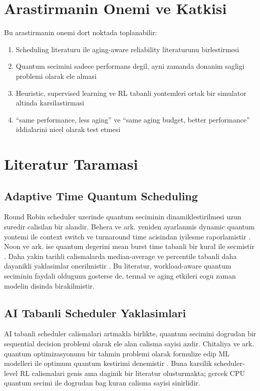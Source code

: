 \documentclass[12pt,a4paper]{article}
\begin{document}
\section{Arastirmanin Onemi ve Katkisi}

Bu arastirmanin onemi dort noktada toplanabilir:

\begin{enumerate}[leftmargin=*]
\item Scheduling literaturu ile aging-aware reliability literaturunu birlestirmesi
\item Quantum secimini sadece performans degil, ayni zamanda donanim sagligi problemi olarak ele almasi
\item Heuristic, supervised learning ve RL tabanli yontemleri ortak bir simulator altinda karsilastirmasi
\item ``same performance, less aging'' ve ``same aging budget, better performance'' iddialarini nicel olarak test etmesi
\end{enumerate}

\section{Literatur Taramasi}

\subsection{Adaptive Time Quantum Scheduling}

Round Robin scheduler uzerinde quantum seciminin dinamiklestirilmesi uzun suredir calisilan bir alandir.
Behera ve ark. yeniden ayarlanmis dynamic quantum yontemi ile context switch ve turnaround time acisindan iyilesme
raporlamistir \cite{behera2010}. Noon ve ark. ise quantum degerini mean burst time tabanli bir kural ile secmistir
\cite{noon2011}. Daha yakin tarihli calismalarda median-average ve percentile tabanli daha dayanikli yaklasimlar
onerilmistir \cite{marr2022,zohora2024}. Bu literatur, workload-aware quantum seciminin faydali oldugunu gosterse de,
termal ve aging etkileri cogu zaman modelin disinda birakilmistir.

\subsection{AI Tabanli Scheduler Yaklasimlari}

AI tabanli scheduler calismalari artmakla birlikte, quantum secimini dogrudan bir sequential decision problemi olarak
ele alan calisma sayisi azdir. Chitaliya ve ark. quantum optimizasyonunu bir tahmin problemi olarak formulize edip
ML modelleri ile optimum quantum kestirimi denemistir \cite{chitaliya2023}. Buna karsilik scheduler-level RL calismalari
genis ama daginik bir literatur olusturmakta; gercek CPU quantum secimi ile dogrudan bag kuran calisma sayisi sinirlidir.
\end{document}
